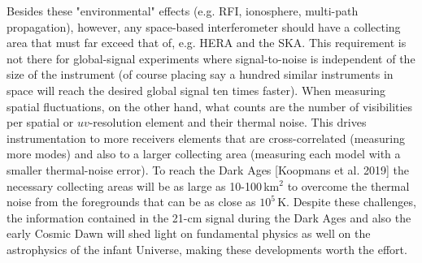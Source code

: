 Besides these "environmental" effects (e.g. RFI, ionosphere, multi-path propagation), however, any space-based interferometer should have a collecting area that must far exceed that of, e.g. HERA and the SKA. This requirement is not there for global-signal experiments where signal-to-noise is independent of the size of the instrument (of course placing say a hundred similar instruments in space will reach the desired global signal ten times faster). When measuring spatial fluctuations, on the other hand, what counts are the number of visibilities per spatial or $uv$-resolution element and their thermal noise. This drives instrumentation to more receivers elements that are cross-correlated (measuring more modes) and also to a larger collecting area (measuring each model with a smaller thermal-noise error).  To reach the Dark Ages [Koopmans et al. 2019] the necessary collecting areas will be as large as 10-100\,km$^2$ to overcome the thermal noise from the foregrounds that can be as close as $10^5$\,K. Despite these challenges, the information contained in the 21-cm signal during the Dark Ages and also the early Cosmic Dawn will shed light on fundamental physics as well on the astrophysics of the infant Universe, making these developments worth the effort.     


